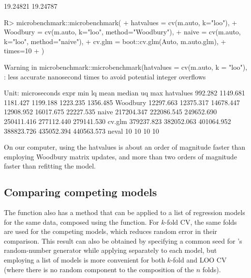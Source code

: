 \documentclass[
]{jss}
\begin{document}
\begin{CodeChunk}
\begin{CodeOutput}
[1] 19.24821 19.24787
\end{CodeOutput}
\begin{CodeInput}
R> microbenchmark::microbenchmark(
+   hatvalues = cv(m.auto, k="loo"),
+   Woodbury = cv(m.auto, k="loo", method="Woodbury"),
+   naive = cv(m.auto, k="loo", method="naive"),
+   cv.glm = boot::cv.glm(Auto, m.auto.glm),
+   times=10
+ )
\end{CodeInput}
\begin{CodeOutput}
Warning in microbenchmark::microbenchmark(hatvalues = cv(m.auto, k = "loo"), :
less accurate nanosecond times to avoid potential integer overflows
\end{CodeOutput}
\begin{CodeOutput}
Unit: microseconds
      expr        min         lq       mean     median         uq        max
 hatvalues    992.282   1149.681   1181.427   1199.188   1223.235   1356.485
  Woodbury  12297.663  12375.317  14678.447  12908.952  16017.675  22227.535
     naive 217204.347 222086.545 249652.690 250411.416 277112.440 279141.530
    cv.glm 379237.823 382052.063 401064.952 388823.726 435052.394 440563.573
 neval
    10
    10
    10
    10
\end{CodeOutput}
\end{CodeChunk}

On our computer, using the hatvalues is about an order of magnitude
faster than employing Woodbury matrix updates, and more than two orders
of magnitude faster than refitting the model.

\subsection{Comparing competing
models}\label{comparing-competing-models}

The  function also has a method that can be applied to a list
of regression models for the same data, composed using the
 function. For \(k\)-fold CV, the same folds are used for
the competing models, which reduces random error in their comparison.
This result can also be obtained by specifying a common seed for
's random-number generator while applying 
separately to each model, but employing a list of models is more
convenient for both \(k\)-fold and LOO CV (where there is no random
component to the composition of the \(n\) folds).
\end{document}
